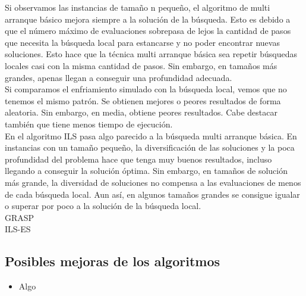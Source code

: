 Si observamos las instancias de tamaño n pequeño, el algoritmo de multi arranque básico mejora siempre a la solución de la búsqueda. Esto es debido a que el número máximo de evaluaciones sobrepasa de lejos la cantidad de pasos que necesita la búsqueda local para estancarse y no poder encontrar nuevas soluciones. Esto hace que la técnica multi arranque básica sea repetir búsquedas locales casi con la misma cantidad de pasos. Sin embargo, en tamaños más grandes, apenas llegan a conseguir una profundidad adecuada. \\

Si comparamos el enfriamiento simulado con la búsqueda local, vemos que no tenemos el mismo patrón. Se obtienen mejores o peores resultados de forma aleatoria. Sin embargo, en media, obtiene peores resultados. Cabe destacar también que tiene menos tiempo de ejecución.\\

En el algoritmo ILS pasa algo parecido a la búsqueda multi arranque básica. En instancias con un tamaño pequeño, la diversificación de las soluciones y la poca profundidad del problema hace que tenga muy buenos resultados, incluso llegando a  conseguir la solución óptima. Sin embargo, en tamaños de solución más grande, la diversidad de soluciones no compensa a las evaluaciones de menos de cada búsqueda local. Aun así, en algunos tamaños grandes se consigue igualar o superar por  poco a la solución de la búsqueda local. \\

GRASP\\

ILS-ES\\


\subsection{Posibles mejoras de los algoritmos}


\begin{itemize}
	\item Algo
	
\end{itemize}














